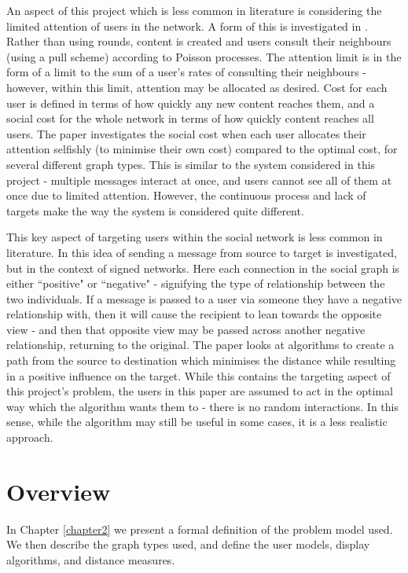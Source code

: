 \documentclass[bsc,frontabs,twoside,singlespacing,parskip,deptreport]{infthesis}     %
\begin{document}
An aspect of this project which is less common in literature is considering the limited attention of users in the network. A form of this is investigated in \cite{AllocatingAttention}. Rather than using rounds, content is created and users consult their neighbours (using a pull scheme) according to Poisson processes. The attention limit is in the form of a limit to the sum of a user's rates of consulting their neighbours - however, within this limit, attention may be allocated as desired. Cost for each user is defined in terms of how quickly any new content reaches them, and a social cost for the whole network in terms of how quickly content reaches all users. The paper investigates the social cost when each user allocates their attention selfishly (to minimise their own cost) compared to the optimal cost, for several different graph types. This is similar to the system considered in this project - multiple messages interact at once, and users cannot see all of them at once due to limited attention. However, the continuous process and lack of targets make the way the system is considered quite different.

This key aspect of targeting users within the social network is less common in literature. In \cite{TargetedSignedNetworks} this idea of sending a message from source to target is investigated, but in the context of signed networks. Here each connection in the social graph is either ``positive" or ``negative" - signifying the type of relationship between the two individuals. If a message is passed to a user via someone they have a negative relationship with, then it will cause the recipient to lean towards the opposite view - and then that opposite view may be passed across another negative relationship, returning to the original. The paper looks at algorithms to create a path from the source to destination which minimises the distance while resulting in a positive influence on the target. While this contains the targeting aspect of this project's problem, the users in this paper are assumed to act in the optimal way which the algorithm wants them to - there is no random interactions. In this sense, while the algorithm may still be useful in some cases, it is a less realistic approach.

\section{Overview}
In Chapter \ref{chapter2} we present a formal definition of the problem model used. We then describe the graph types used, and define the user models, display algorithms, and distance measures.
\end{document}
